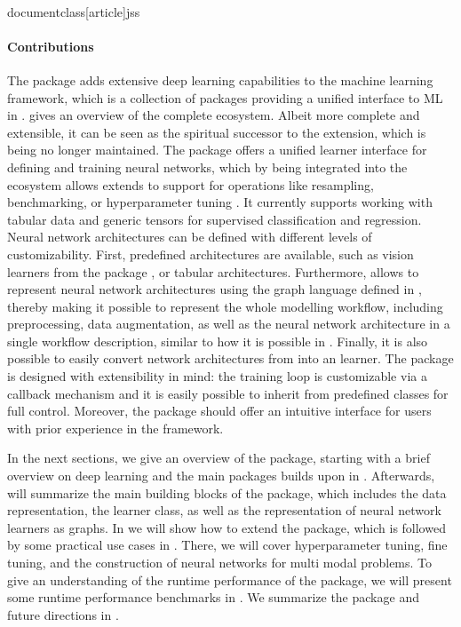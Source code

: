 \\documentclass[article]{jss}
\theoremstyle{definition}
\begin{document}
\paragraph{Contributions} The  package adds extensive deep learning capabilities to the \mlrt{} machine learning framework, which is a collection of \rlang{} packages providing a unified interface to ML in \rlang{}.
 gives an overview of the complete ecosystem.
Albeit more complete and extensible, it can be seen as the spiritual successor to the  \citep{ref-mlr3keras2021} extension, which is being no longer maintained.
The package offers a unified learner interface for defining and training neural networks, which by being integrated into the ecosystem allows extends to support for operations like resampling, benchmarking, or hyperparameter tuning \citep{ref-mlr3tuning2024}.
It currently supports working with tabular data and generic tensors for supervised classification and regression.
Neural network architectures can be defined with different levels of customizability.
First, predefined architectures are available, such as vision learners from the  \rlang{} package \citep{ref-r-torchvision}, or tabular architectures.
Furthermore, \mlrttorch{} allows to represent neural network architectures using the graph language defined in \mlrtpipelines{}, thereby making it possible to represent the whole modelling workflow, including preprocessing, data augmentation, as well as the neural network architecture in a single workflow description, similar to how it is possible in \keras{} \citep{ref-chollet2018keras}.
Finally, it is also possible to easily convert network architectures from \torch{} into an \mlrt{} learner.
The package is designed with extensibility in mind: the training loop is customizable via a callback mechanism and it is easily possible to inherit from predefined classes for full control.
Moreover, the package should offer an intuitive interface for users with prior experience in the \mlrt{} framework.

In the next sections, we give an overview of the package, starting with a brief overview on deep learning and the main \rlang{} packages \mlrttorch{} builds upon in .
Afterwards,  will summarize the main building blocks of the package, which includes the data representation, the learner class, as well as the representation of neural network learners as graphs.
In  we will show how to extend the package, which is followed by some practical use cases in .
There, we will cover hyperparameter tuning, fine tuning, and the construction of neural networks for multi modal problems.
To give an understanding of the runtime performance of the package, we will present some runtime performance benchmarks in .
We summarize the package and future directions in .
\end{document}
